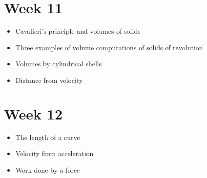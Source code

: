 \documentclass{amsproc}
\begin{document}
\section*{Week 11}
\begin{itemize}
\item Cavalieri's principle and volumes of solids
\item Three examples of volume computations of solids of revolution
\item Volumes by cylindrical shells
\item Distance from velocity
\end{itemize}

\section*{Week 12}
\begin{itemize}
\item The length of a curve
\item Velocity from acceleration
\item Work done by a force
\end{itemize}
\end{document}
